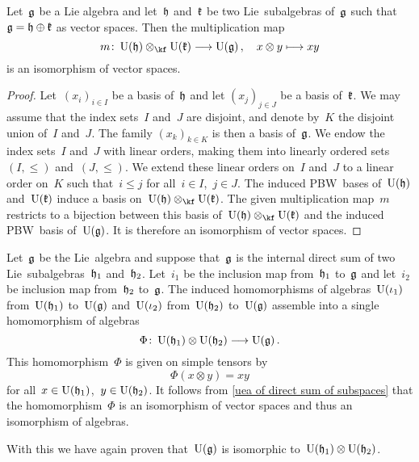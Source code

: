 \begin{proposition}
  \label{uea of direct sum of subspaces}
  Let~$\mathfrak{g}$ be a Lie algebra and let~$\mathfrak{h}$ and~$\mathfrak{k}$ be two Lie~subalgebras of~$\mathfrak{g}$ such that~$\mathfrak{g} = \mathfrak{h} \oplus \mathfrak{k}$ as vector spaces.
  Then the multiplication map
  \[
    m
    \colon
    \Univ(\hlie) \tensor_{\kf} \Univ(\klie)
    \to
    \Univ(\glie) \,,
    \quad
    x \tensor y
    \mapsto
    xy
  \]
  is an isomorphism of vector spaces.
\end{proposition}


\begin{proof}
  Let~$(x_i)_{i \in I}$ be a basis of~$\mathfrak{h}$ and let $(x_j)_{j \in J}$ be a basis of~$\mathfrak{k}$.
  We may assume that the index sets~$I$ and~$J$ are disjoint, and denote by~$K$ the disjoint union of~$I$ and~$J$.
  The family $(x_k)_{k \in K}$ is then a basis of~$\mathfrak{g}$.
  We endow the index sets~$I$ and~$J$ with linear orders, making them into linearly ordered sets~$(I, \leq)$ and~$(J, \leq)$.
  We extend these linear orders on~$I$ and~$J$ to a linear order on~$K$ such that~$i \leq j$ for all~$i \in I$,~$j \in J$.
  The induced PBW~bases of~$\operatorname{U}(\mathfrak{h})$ and~$\operatorname{U}(\mathfrak{k})$ induce a basis on~$\Univ(\hlie) \otimes_{\kf} \Univ(\klie)$.
  The given multiplication map~$m$ restricts to a bijection between this basis of~$\Univ(\hlie) \otimes_{\kf} \Univ(\klie)$ and the induced PBW~basis of~$\operatorname{U}(\mathfrak{g})$.
  It is therefore an isomorphism of vector spaces.
\end{proof}


\begin{remark}
  Let~$\mathfrak{g}$ be the Lie~algebra and suppose that~$\mathfrak{g}$ is the internal direct sum of two Lie~subalgebras~$\mathfrak{h}_1$ and~$\mathfrak{h}_2$.
  Let~$i_1$ be the inclusion map from~$\mathfrak{h}_1$ to~$\mathfrak{g}$ and let~$i_2$ be inclusion map from~$\mathfrak{h}_2$ to~$\mathfrak{g}$.
  The induced homomorphisms of algebras~$\operatorname{U}(\iota_1)$ from~$\operatorname{U}(\mathfrak{h}_1)$ to~$\operatorname{U}(\mathfrak{g})$ and~$\operatorname{U}(\iota_2)$ from~$\operatorname{U}(\mathfrak{h}_2)$ to~$\operatorname{U}(\mathfrak{g})$ assemble into a single homomorphism of algebras
  \[
    \Phi
    \colon
    \Univ(\hlie_1) \otimes \Univ(\hlie_2)
    \to
    \Univ(\glie) \,.
  \]
  This homomorphism~$\Phi$ is given on simple tensors by
  \[
    \Phi(x \otimes y)
    =
    x y
  \]
  for all~$x \in \operatorname{U}(\mathfrak{h}_1)$,~$y \in \operatorname{U}(\mathfrak{h}_2)$.
  It follows from \cref{uea of direct sum of subspaces} that the homomorphism~$\Phi$ is an isomorphism of vector spaces and thus an isomorphism of algebras.

  With this we have again proven that~$\operatorname{U}(\mathfrak{g})$ is isomorphic to~$\operatorname{U}(\mathfrak{h}_1) \otimes \operatorname{U}(\mathfrak{h}_2)$.
\end{remark}



